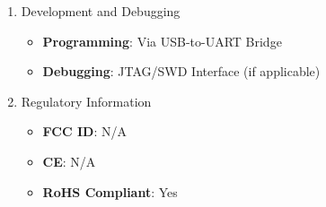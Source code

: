 \documentclass[conference]{IEEEtran}
\begin{document}
\begin{enumerate}[label=\arabic*.]
\item Development and Debugging\\
\begin{itemize}
\item \textbf{Programming}: Via USB-to-UART Bridge\\
\item \textbf{Debugging}: JTAG/SWD Interface (if applicable)\\
\end{itemize}

\item Regulatory Information\\
\begin{itemize}
\item \textbf{FCC ID}: N/A\\
\item \textbf{CE}: N/A\\
\item \textbf{RoHS Compliant}: Yes\\
\end{itemize}
\end{enumerate}
\end{document}
